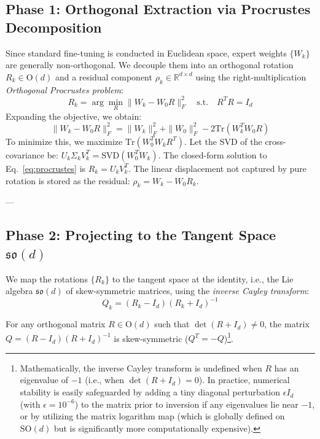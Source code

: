 \subsection{Phase 1: Orthogonal Extraction via Procrustes Decomposition}
Since standard fine-tuning is conducted in Euclidean space, expert weights $\{W_k\}$ are generally non-orthogonal. We decouple them into an orthogonal rotation $R_k \in \mathrm{O}(d)$ and a residual component $\rho_k \in \mathbb{R}^{d \times d}$ using the right-multiplication \emph{Orthogonal Procrustes problem}:
\begin{equation}
\label{eq:procrustes}
R_k = \arg\min_{R} \|W_k - W_0 R\|_F^2 \quad \text{s.t.} \quad R^T R = I_d
\end{equation}
Expanding the objective, we obtain:
\begin{equation*}
\|W_k - W_0 R\|_F^2 = \|W_k\|_F^2 + \|W_0\|_F^2 - 2 \mathrm{Tr}(W_k^T W_0 R)
\end{equation*}
To minimize this, we maximize $\mathrm{Tr}(W_0^T W_k R^T)$. Let the SVD of the cross-covariance be: $U_k \Sigma_k V_k^T = \mathrm{SVD}(W_0^T W_k)$. The closed-form solution to Eq.~\ref{eq:procrustes} is $R_k = U_k V_k^T$. The linear displacement not captured by pure rotation is stored as the residual: $\rho_k = W_k - W_0 R_k$.

---

\subsection{Phase 2: Projecting to the Tangent Space $\mathfrak{so}(d)$}
We map the rotations $\{R_k\}$ to the tangent space at the identity, i.e., the Lie algebra $\mathfrak{so}(d)$ of skew-symmetric matrices, using the \emph{inverse Cayley transform}:
\begin{equation}
\label{eq:inv_cayley}
Q_k = (R_k - I_d)(R_k + I_d)^{-1}
\end{equation}

\begin{proposition}
For any orthogonal matrix $R \in \mathrm{O}(d)$ such that $\det(R + I_d) \ne 0$, the matrix $Q = (R - I_d)(R + I_d)^{-1}$ is skew-symmetric ($Q^T = -Q$)\footnote{Mathematically, the inverse Cayley transform is undefined when $R$ has an eigenvalue of $-1$ (i.e., when $\det(R + I_d) = 0$). In practice, numerical stability is easily safeguarded by adding a tiny diagonal perturbation $\epsilon I_d$ (with $\epsilon = 10^{-6}$) to the matrix prior to inversion if any eigenvalues lie near $-1$, or by utilizing the matrix logarithm map (which is globally defined on $\mathrm{SO}(d)$ but is significantly more computationally expensive).}.
\end{proposition}

